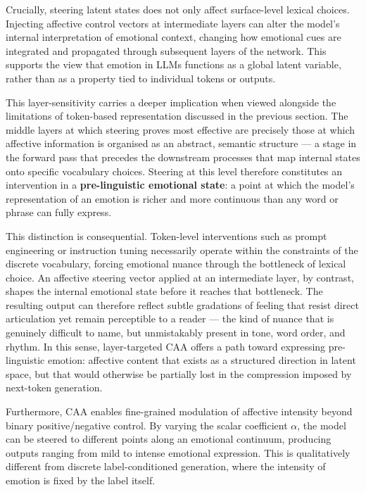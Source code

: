 Crucially, steering latent states does not only affect surface-level lexical choices. Injecting affective control vectors at intermediate layers can alter the model's internal interpretation of emotional context, changing how emotional cues are integrated and propagated through subsequent layers of the network. This supports the view that emotion in LLMs functions as a global latent variable, rather than as a property tied to individual tokens or outputs.

This layer-sensitivity carries a deeper implication when viewed alongside the limitations of token-based representation discussed in the previous section. The middle layers at which steering proves most effective are precisely those at which affective information is organised as an abstract, semantic structure — a stage in the forward pass that precedes the downstream processes that map internal states onto specific vocabulary choices. Steering at this level therefore constitutes an intervention in a \textbf{pre-linguistic emotional state}: a point at which the model's representation of an emotion is richer and more continuous than any word or phrase can fully express.

This distinction is consequential. Token-level interventions such as prompt engineering or instruction tuning necessarily operate within the constraints of the discrete vocabulary, forcing emotional nuance through the bottleneck of lexical choice. An affective steering vector applied at an intermediate layer, by contrast, shapes the internal emotional state before it reaches that bottleneck. The resulting output can therefore reflect subtle gradations of feeling that resist direct articulation yet remain perceptible to a reader — the kind of nuance that is genuinely difficult to name, but unmistakably present in tone, word order, and rhythm. In this sense, layer-targeted CAA offers a path toward expressing pre-linguistic emotion: affective content that exists as a structured direction in latent space, but that would otherwise be partially lost in the compression imposed by next-token generation.

Furthermore, CAA enables fine-grained modulation of affective intensity beyond binary positive/negative control. By varying the scalar coefficient $\alpha$, the model can be steered to different points along an emotional continuum, producing outputs ranging from mild to intense emotional expression. This is qualitatively different from discrete label-conditioned generation, where the intensity of emotion is fixed by the label itself.

